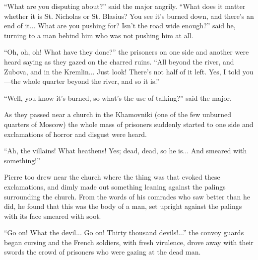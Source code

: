``What are you disputing about?'' said the major angrily. ``What
does it matter whether it is St. Nicholas or St. Blasius? You see
it's burned down, and there's an end of it... What are you
pushing for? Isn't the road wide enough?'' said he, turning to a
man behind him who was not pushing him at all.

``Oh, oh, oh! What have they done?'' the prisoners on one side
and another were heard saying as they gazed on the charred
ruins. ``All beyond the river, and Zubova, and in the
Kremlin... Just look! There's not half of it left. Yes, I told
you---the whole quarter beyond the river, and so it is.''

``Well, you know it's burned, so what's the use of talking?''
said the major.

As they passed near a church in the Khamovniki (one of the few
unburned quarters of Moscow) the whole mass of prisoners suddenly
started to one side and exclamations of horror and disgust were
heard.

``Ah, the villains! What heathens! Yes; dead, dead, so he
is... And smeared with something!''

Pierre too drew near the church where the thing was that evoked
these exclamations, and dimly made out something leaning against
the palings surrounding the church. From the words of his
comrades who saw better than he did, he found that this was the
body of a man, set upright against the palings with its face
smeared with soot.

``Go on! What the devil... Go on! Thirty thousand devils!...''
the convoy guards began cursing and the French soldiers, with
fresh virulence, drove away with their swords the crowd of
prisoners who were gazing at the dead man.


